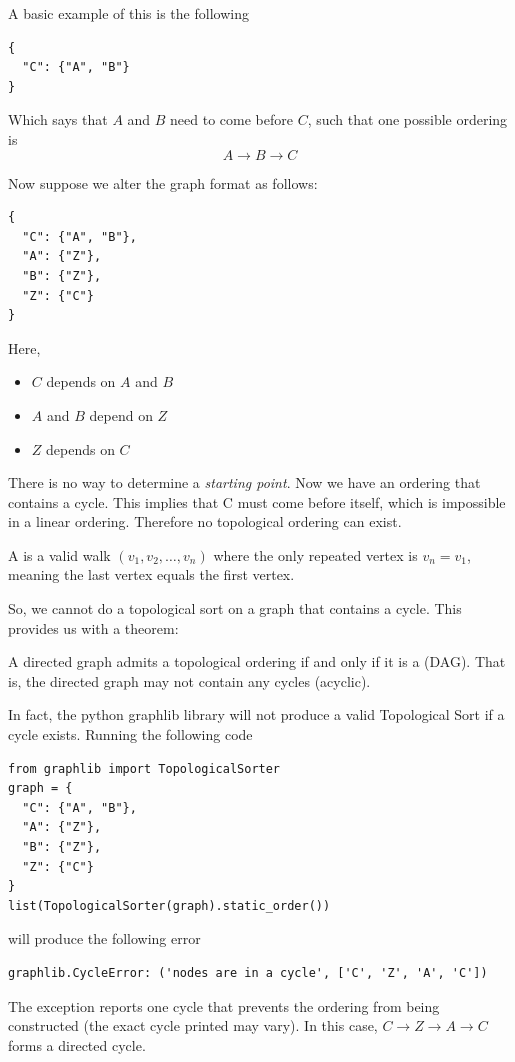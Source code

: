 A basic example of this is the following

\begin{verbatim}
{
  "C": {"A", "B"}
}
\end{verbatim}
Which says that $A$ and $B$ need to come before $C$, such that one possible ordering is
$$A \rightarrow B \rightarrow C$$

Now suppose we alter the graph format as follows:
\begin{verbatim}
{
  "C": {"A", "B"},
  "A": {"Z"},
  "B": {"Z"},
  "Z": {"C"}
}
\end{verbatim}
Here,
\begin{itemize}
	\item $C$ depends on $A$ and $B$
	\item $A$ and $B$ depend on $Z$
	\item $Z$ depends on $C$
\end{itemize}
There is no way to determine a \emph{starting point}. Now we have an ordering that contains a cycle. This implies that C must come before itself, which is impossible in a linear ordering. Therefore no topological ordering can exist.
\begin{definition}[Cycle]
	A  is a valid walk $\displaystyle (v_{1},v_{2},\dotsc ,v_{n})$ where the only repeated vertex is ${\displaystyle v_{n}=v_{1}}$, meaning the last vertex equals the first vertex.
\end{definition}
So, we cannot do a topological sort on a graph that contains a cycle. This provides us with a theorem:
\begin{mdframed}[frametitle = {Topological Sorting and DAGs}, style = important]
	A directed graph admits a topological ordering if and only if it is a  (DAG). That is, the directed graph may not contain any cycles (acyclic).
\end{mdframed}
In fact, the python graphlib library will not produce a valid Topological Sort if a cycle exists. Running the following code
\begin{verbatim}
from graphlib import TopologicalSorter
graph = {
  "C": {"A", "B"},
  "A": {"Z"},
  "B": {"Z"},
  "Z": {"C"}
}
list(TopologicalSorter(graph).static_order())
\end{verbatim}
will produce the following error 
\begin{verbatim}
graphlib.CycleError: ('nodes are in a cycle', ['C', 'Z', 'A', 'C'])
\end{verbatim}
The exception reports one cycle that prevents the ordering from being constructed (the exact cycle printed may vary). In this case, $C\rightarrow Z\rightarrow A\rightarrow C$ forms a directed cycle.

